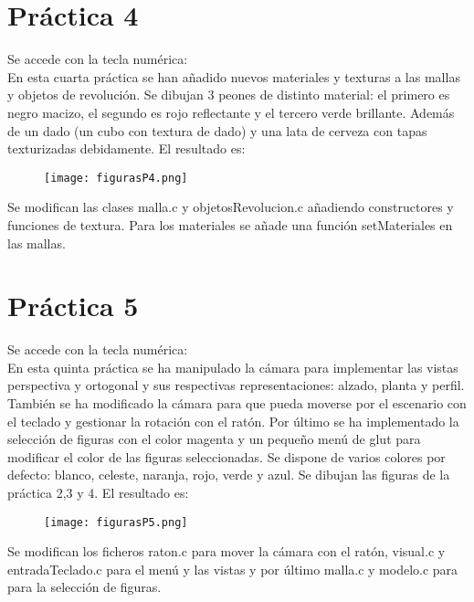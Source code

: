 \section{Práctica 4}
Se accede con la tecla numérica: \\
En esta cuarta práctica se han añadido nuevos materiales y texturas a las mallas y objetos de revolución. Se dibujan 3 peones de distinto material: el primero es negro macizo, el segundo es rojo reflectante y el tercero verde brillante. Además de un dado (un cubo con textura de dado) y una lata de cerveza con tapas texturizadas debidamente. El resultado es:
\begin{figure}[H]
	\centering
	\texttt{[image: figurasP4.png]}
\end{figure} 

Se modifican las clases malla.c y objetosRevolucion.c añadiendo constructores y funciones de textura. Para los materiales se añade una función setMateriales en las mallas.

\section{Práctica 5}
Se accede con la tecla numérica: \\
En esta quinta práctica se ha manipulado la cámara para implementar las vistas perspectiva y ortogonal y sus respectivas representaciones: alzado, planta y perfil. También se ha modificado la cámara para que pueda moverse por el escenario con el teclado y gestionar la rotación con el ratón. Por último se ha implementado la selección de figuras con el color magenta y un pequeño menú de glut para modificar el color de las figuras seleccionadas. Se dispone de varios colores por defecto: blanco, celeste, naranja, rojo, verde y azul. Se dibujan las figuras de la práctica 2,3 y 4. El resultado es:

\begin{figure}[H]
	\centering
	\texttt{[image: figurasP5.png]}
\end{figure} 

Se modifican los ficheros raton.c para mover la cámara con el ratón, visual.c y entradaTeclado.c para el menú y las vistas y por último malla.c y modelo.c para para la selección de figuras.

